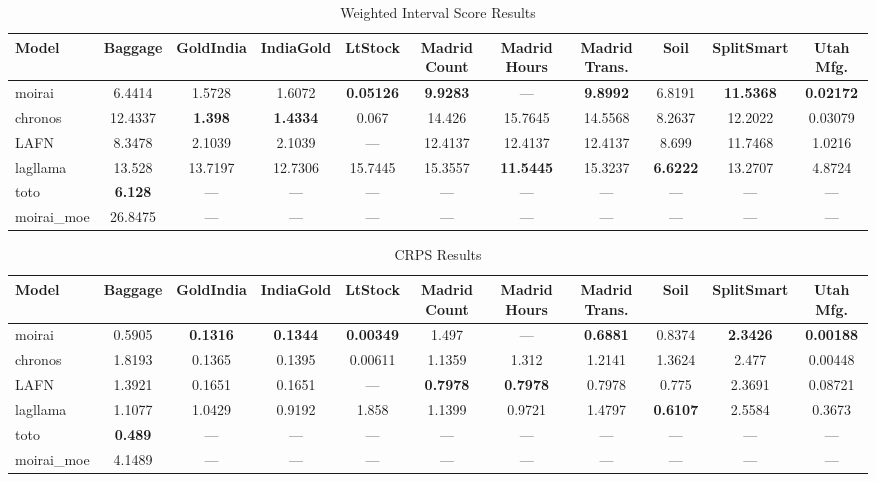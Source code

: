 \begin{table}
\centering
\caption{Weighted Interval Score Results}
\label{tab:weighted_interval_score}
\begin{adjustbox}{width=0.95\textheight,center}
\small
\begin{tabular}{lcccccccccc}
\toprule
Model & Baggage & GoldIndia & IndiaGold & LtStock & Madrid Count & Madrid Hours & Madrid Trans. & Soil & SplitSmart & Utah Mfg. \\
\midrule
moirai & 6.4414 & 1.5728 & 1.6072 & \textbf{0.05126} & \textbf{9.9283} & --- & \textbf{9.8992} & 6.8191 & \textbf{11.5368} & \textbf{0.02172} \\
chronos & 12.4337 & \textbf{1.398} & \textbf{1.4334} & 0.067 & 14.426 & 15.7645 & 14.5568 & 8.2637 & 12.2022 & 0.03079 \\
LAFN & 8.3478 & 2.1039 & 2.1039 & --- & 12.4137 & 12.4137 & 12.4137 & 8.699 & 11.7468 & 1.0216 \\
lagllama & 13.528 & 13.7197 & 12.7306 & 15.7445 & 15.3557 & \textbf{11.5445} & 15.3237 & \textbf{6.6222} & 13.2707 & 4.8724 \\
toto & \textbf{6.128} & --- & --- & --- & --- & --- & --- & --- & --- & --- \\
moirai\_moe & 26.8475 & --- & --- & --- & --- & --- & --- & --- & --- & --- \\
\bottomrule
\end{tabular}
\end{adjustbox}
\end{table}

\begin{table}
\centering
\caption{CRPS Results}
\label{tab:crps}
\begin{adjustbox}{width=0.95\textheight,center}
\small
\begin{tabular}{lcccccccccc}
\toprule
Model & Baggage & GoldIndia & IndiaGold & LtStock & Madrid Count & Madrid Hours & Madrid Trans. & Soil & SplitSmart & Utah Mfg. \\
\midrule
moirai & 0.5905 & \textbf{0.1316} & \textbf{0.1344} & \textbf{0.00349} & 1.497 & --- & \textbf{0.6881} & 0.8374 & \textbf{2.3426} & \textbf{0.00188} \\
chronos & 1.8193 & 0.1365 & 0.1395 & 0.00611 & 1.1359 & 1.312 & 1.2141 & 1.3624 & 2.477 & 0.00448 \\
LAFN & 1.3921 & 0.1651 & 0.1651 & --- & \textbf{0.7978} & \textbf{0.7978} & 0.7978 & 0.775 & 2.3691 & 0.08721 \\
lagllama & 1.1077 & 1.0429 & 0.9192 & 1.858 & 1.1399 & 0.9721 & 1.4797 & \textbf{0.6107} & 2.5584 & 0.3673 \\
toto & \textbf{0.489} & --- & --- & --- & --- & --- & --- & --- & --- & --- \\
moirai\_moe & 4.1489 & --- & --- & --- & --- & --- & --- & --- & --- & --- \\
\bottomrule
\end{tabular}
\end{adjustbox}
\end{table}
